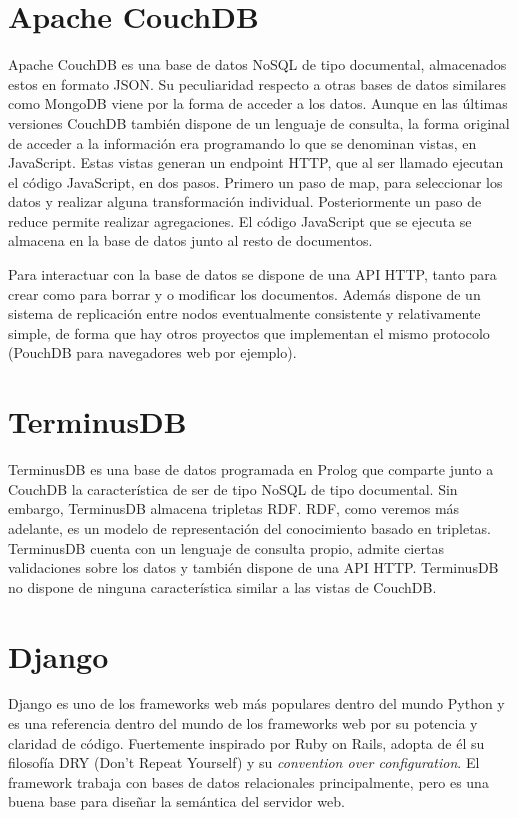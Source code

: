 \documentclass[12pt]{report} %
\begin{document}
\section{Apache CouchDB}
Apache CouchDB es una base de datos NoSQL de tipo documental, almacenados estos en formato JSON.\cite{couchdb}
Su peculiaridad respecto a otras bases de datos similares como MongoDB viene por la forma de acceder a los datos.
Aunque en las últimas versiones CouchDB también dispone de un lenguaje de consulta, la forma original de acceder a la información era programando lo que se denominan vistas, en JavaScript.
Estas vistas generan un endpoint HTTP, que al ser llamado ejecutan el código JavaScript, en dos pasos. Primero un paso de map, para seleccionar los datos y realizar alguna transformación individual.
Posteriormente un paso de reduce permite realizar agregaciones. El código JavaScript que se ejecuta se almacena en la base de datos junto al resto de documentos.

Para interactuar con la base de datos se dispone de una API HTTP, tanto para crear como para borrar y o modificar los documentos.
Además dispone de un sistema de replicación entre nodos eventualmente consistente y relativamente simple, de forma que hay otros proyectos que implementan el mismo protocolo (PouchDB para navegadores web por ejemplo).

\section{TerminusDB}
TerminusDB es una base de datos programada en Prolog que comparte junto a CouchDB la característica de ser de tipo NoSQL de tipo documental.\cite{terminusdb}
Sin embargo, TerminusDB almacena tripletas RDF. RDF, como veremos más adelante, es un modelo de representación del conocimiento basado en tripletas.
TerminusDB cuenta con un lenguaje de consulta propio, admite ciertas validaciones sobre los datos y también dispone de una API HTTP.
TerminusDB no dispone de ninguna característica similar a las vistas de CouchDB.


\section{Django}
Django es uno de los frameworks web más populares dentro del mundo Python y es una referencia dentro del mundo de los frameworks web por su potencia y claridad de código.\cite{django}
Fuertemente inspirado por Ruby on Rails, adopta de él su filosofía DRY (Don't Repeat Yourself) y su \textit{convention over configuration}.
El framework trabaja con bases de datos relacionales principalmente, pero es una buena base para diseñar la semántica del servidor web. 
\end{document}
